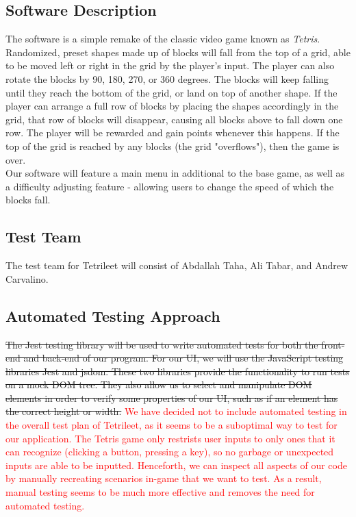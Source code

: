 \documentclass[12pt, titlepage]{article}
\begin{document}
\subsection{Software Description}

The software is a simple remake of the classic video game known as \emph{Tetris}. Randomized, preset shapes made up of blocks will fall from the top of a grid, able to be moved left or right in the grid by the player's input. The player can also rotate the blocks by 90, 180, 270, or 360 degrees. The blocks will keep falling until they reach the bottom of the grid, or land on top of another shape. If the player can arrange a full row of blocks by placing the shapes accordingly in the grid, that row of blocks will disappear, causing all blocks above to fall down one row. The player will be rewarded and gain points whenever this happens. If the top of the grid is reached by any blocks (the grid "overflows"), then the game is over.\\
Our software will feature a main menu in additional to the base game, as well as a difficulty adjusting feature - allowing users to change the speed of which the blocks fall.

\subsection{Test Team}
The test team for Tetrileet will consist of Abdallah Taha, Ali Tabar, and Andrew Carvalino.

\subsection{Automated Testing Approach}
\sout{The Jest testing library will be used to write automated tests for both the front-end and back-end of our program. For our UI, we will use the JavaScript testing libraries Jest and jsdom. These two libraries provide the functionality to run tests on a mock DOM tree. They also allow us to select and manipulate DOM elements in order to verify some properties of our UI, such as if an element has the correct height or width.} \textcolor{red}{We have decided not to include automated testing in the overall test plan of Tetrileet, as it seems to be a suboptimal way to test for our application. The Tetris game only restrists user inputs to only ones that it can recognize (clicking a button, pressing a key), so no garbage or unexpected inputs are able to be inputted. Henceforth, we can inspect all aspects of our code by manually recreating scenarios in-game that we want to test. As a result, manual testing seems to be much more effective and removes the need for automated testing.}
\end{document}
